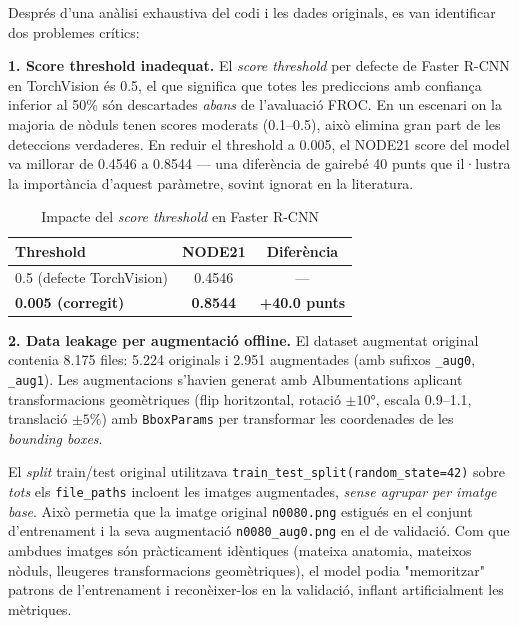 \documentclass[conference]{IEEEtran}
\begin{document}
Després d'una anàlisi exhaustiva del codi i les dades originals, es van identificar dos problemes crítics:

\textbf{1. Score threshold inadequat.} El \textit{score threshold} per defecte de Faster R-CNN en TorchVision és 0.5, el que significa que totes les prediccions amb confiança inferior al 50\% són descartades \textit{abans} de l'avaluació FROC. En un escenari on la majoria de nòduls tenen scores moderats (0.1--0.5), això elimina gran part de les deteccions verdaderes. En reduir el threshold a 0.005, el NODE21 score del model va millorar de 0.4546 a 0.8544 --- una diferència de gairebé 40 punts que il·lustra la importància d'aquest paràmetre, sovint ignorat en la literatura.

\begin{table}[H]
\centering
\caption{Impacte del \textit{score threshold} en Faster R-CNN}
\label{tab:threshold}
\begin{tabular}{lcc}
\toprule
\textbf{Threshold} & \textbf{NODE21} & \textbf{Diferència} \\
\midrule
0.5 (defecte TorchVision) & 0.4546 & --- \\
\textbf{0.005 (corregit)} & \textbf{0.8544} & \textbf{+40.0 punts} \\
\bottomrule
\end{tabular}
\end{table}

\textbf{2. Data leakage per augmentació offline.} El dataset augmentat original contenia 8.175 files: 5.224 originals i 2.951 augmentades (amb sufixos \texttt{\_aug0}, \texttt{\_aug1}). Les augmentacions s'havien generat amb Albumentations aplicant transformacions geomètriques (flip horitzontal, rotació $\pm 10°$, escala 0.9--1.1, translació $\pm 5\%$) amb \texttt{BboxParams} per transformar les coordenades de les \textit{bounding boxes}.

El \textit{split} train/test original utilitzava \texttt{train\_test\_split(random\_state=42)} sobre \textit{tots} els \texttt{file\_paths} incloent les imatges augmentades, \textit{sense agrupar per imatge base}. Això permetia que la imatge original \texttt{n0080.png} estigués en el conjunt d'entrenament i la seva augmentació \texttt{n0080\_aug0.png} en el de validació. Com que ambdues imatges són pràcticament idèntiques (mateixa anatomia, mateixos nòduls, lleugeres transformacions geomètriques), el model podia "memoritzar" patrons de l'entrenament i reconèixer-los en la validació, inflant artificialment les mètriques.
\end{document}
